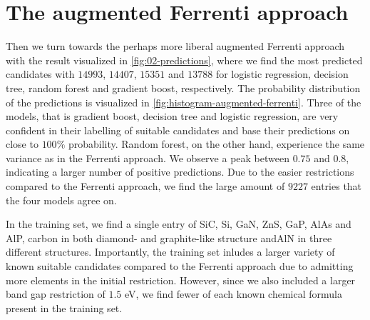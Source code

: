 \begin{comment}
\begin{table}[!ht]
\centering
\caption{Table of the number of predictions made with the optimal model for the insightful approach. }
\label{tab:timing-extraction}
\noindent\makebox[\textwidth]{
\begin{tabular}{M{3.0cm} M{4.0cm} M{4.0cm}}
  \hline
  \hline
   Model & Optimal number PC & Number of predictions \\
  \hline
  Logistic regression & $145$  & $454$ \\
  Decision trees      &  $3$   & $442$ \\
  Random forest       &  $10 $ & $325$ \\
  Gradient boost      &  $7$   & $699$ \\
  \hline
  \hline
\end{tabular}
}
\end{table}
\end{comment}


\section{The augmented Ferrenti approach}
Then we turn towards the perhaps more liberal augmented Ferrenti approach with the result visualized in \autoref{fig:02-predictions}, where we find the most predicted candidates with $14993$, $14407$, $15351$ and $13788$ for logistic regression, decision tree, random forest and gradient boost, respectively. The probability distribution of the predictions is visualized in \autoref{fig:histogram-augmented-ferrenti}. Three of the models, that is gradient boost, decision tree and logistic regression, are very confident in their labelling of suitable candidates and base their predictions on close to $100\%$ probability. Random forest, on the other hand, experience the same variance as in the Ferrenti approach. We observe a peak between $0.75$ and $0.8$, indicating a larger number of positive predictions. Due to the easier restrictions compared to the Ferrenti approach, we find the large amount of $9227$ entries that the four models agree on.



\noindent In the training set, we find a single entry of SiC, Si, GaN, ZnS, GaP, AlAs and AlP, carbon in both diamond- and graphite-like structure andAlN in three different structures. Importantly, the training set inludes a larger variety of known suitable candidates compared to the Ferrenti approach due to admitting more elements in the initial restriction. However, since we also included a larger band gap restriction of $1.5$ eV, we find fewer of each known chemical formula present in the training set.

